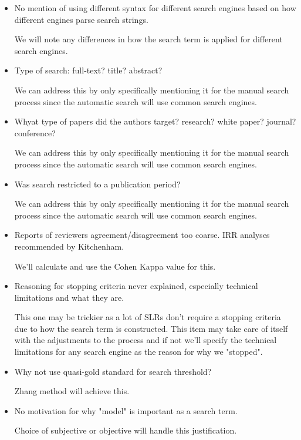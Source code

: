 \begin{itemize}
\item No mention of using different syntax for different search engines based on how different engines parse search strings.

We will note any differences in how the search term is applied for different search engines.

\item Type of search: full-text? title? abstract?

We can address this by only specifically mentioning it for the manual search process since the automatic search will use common search engines.

\item Whyat type of papers did the authors target? research? white paper? journal? conference?

We can address this by only specifically mentioning it for the manual search process since the automatic search will use common search engines.

\item Was search restricted to a publication period?

We can address this by only specifically mentioning it for the manual search process since the automatic search will use common search engines.

\item Reports of reviewers agreement/disagreement too coarse. IRR analyses recommended by Kitchenham.

We'll calculate and use the Cohen Kappa value for this.

\item Reasoning for stopping criteria never explained, especially technical limitations and what they are.

This one may be trickier as a lot of SLRs don't require a stopping criteria due to how the search term is constructed.
This item may take care of itself with the adjustments to the process and if not we'll specify the technical limitations for any search engine as the reason for why we "stopped".

\item Why not use quasi-gold standard for search threshold?

Zhang method will achieve this.

\item No motivation for why "model" is important as a search term.

Choice of subjective or objective will handle this justification.


\end{itemize}
